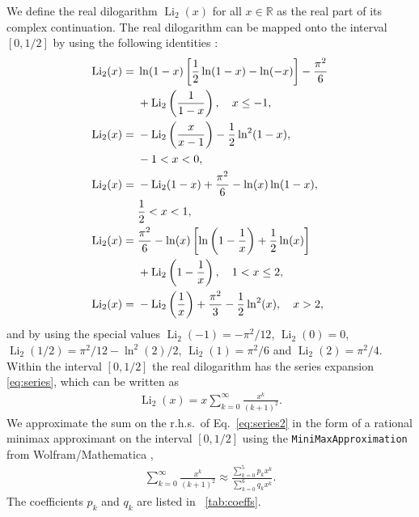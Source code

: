 \documentclass[10pt,DIV16,twocolumn,numbers=noenddot]{scrartcl}
\newcommand{\Li}{\operatorname{Li}_2}
\newcommand{\tabref}[1]{\tablename~\ref{#1}}
\begin{document}
We define the real dilogarithm $\Li(x)$ for all $x\in\mathbb{R}$ as
the real part of its complex continuation.  The real dilogarithm can
be mapped onto the interval $[0,1/2]$ by using the following
identities \cite{lewin}:
%
\begin{align}
  \Li(x) ={}& \ln(1-x)\left[\frac{1}{2}\ln(1-x) - \ln(-x)\right] - \frac{\pi^2}{6}
              \notag \\ &+\Li\left(\frac{1}{1-x}\right), \quad x\leq -1, \\
  \Li(x) ={}& -\Li\left(\frac{x}{x-1}\right) - \frac{1}{2}\ln^2(1-x),
              \notag \\ & -1<x<0, \\
  \Li(x) ={}& -\Li(1-x) + \frac{\pi^2}{6} - \ln(x) \ln(1-x),
              \notag \\ &\frac{1}{2}<x<1, \\
  \Li(x) ={}& \frac{\pi^2}{6} - \ln(x)\left[\ln\left(1-\frac{1}{x}\right) + \frac{1}{2}\ln(x)\right]
              \notag \\ &+ \Li\left(1-\frac{1}{x}\right), \quad 1<x\leq 2, \\
  \Li(x) ={}& -\Li\left(\frac{1}{x}\right) + \frac{\pi^2}{3} - \frac{1}{2} \ln^2(x), \quad x>2,
\end{align}
%
and by using the special values $\Li(-1)=-\pi^2/12$, $\Li(0)=0$,
$\Li(1/2)=\pi^2/12-\ln^2(2)/2$, $\Li(1)=\pi^2/6$ and $\Li(2)=\pi^2/4$.
Within the interval $[0,1/2]$ the real dilogarithm has the series
expansion \eqref{eq:series}, which can be written as
%
\begin{align}
  \Li(x) = x \sum_{k=0}^\infty \frac{x^{k}}{(k+1)^2}.
  \label{eq:series2}
\end{align}
%
We approximate the sum on the r.h.s.\ of Eq.~\eqref{eq:series2} in the
form of a rational minimax approximant on the interval $[0,1/2]$ using
the \texttt{MiniMaxApproximation} from Wolfram/Mathematica
\cite{mathematica},
%
\begin{align}
  \sum_{k=0}^\infty \frac{x^{k}}{(k+1)^2} \approx
  \frac{\sum_{k=0}^5 p_kx^k}{\sum_{k=0}^6 q_kx^k}.
  \label{eq:minimax}
\end{align}
%
The coefficients $p_k$ and $q_k$ are listed in \tabref{tab:coeffs}.
%
\end{document}
